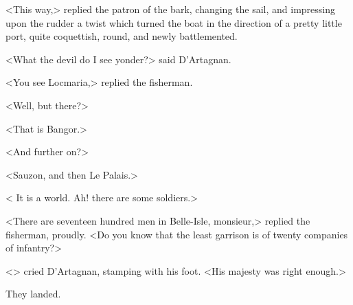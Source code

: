 <This way,> replied the patron of the bark, changing the sail, and impressing upon the rudder a twist which turned the boat in the direction of a pretty little port, quite coquettish, round, and newly battlemented.

<What the devil do I see yonder?> said D'Artagnan.

<You see Locmaria,> replied the fisherman.

<Well, but there?>

<That is Bangor.>

<And further on?>

<Sauzon, and then Le Palais.>

< It is a world. Ah! there are some soldiers.>

<There are seventeen hundred men in Belle-Isle, monsieur,> replied the fisherman, proudly. <Do you know that the least garrison is of twenty companies of infantry?>

<> cried D'Artagnan, stamping with his foot. <His majesty was right enough.>

They landed. 